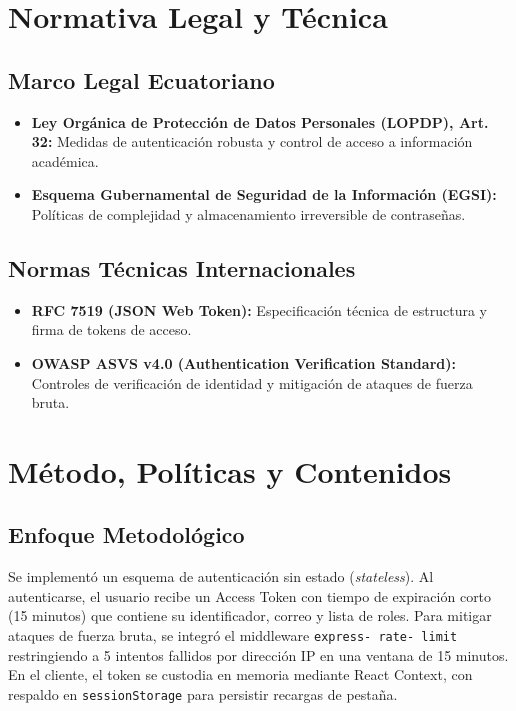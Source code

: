 \documentclass[12pt,a4paper]{article}
\begin{document}
\section{Normativa Legal y Técnica}
\subsection{Marco Legal Ecuatoriano}
\begin{itemize}[leftmargin=1.5em, itemsep=2pt]
    \item \textbf{Ley Orgánica de Protección de Datos Personales (LOPDP), Art. 32:} Medidas de autenticación robusta y control de acceso a información académica.
    \item \textbf{Esquema Gubernamental de Seguridad de la Información (EGSI):} Políticas de complejidad y almacenamiento irreversible de contraseñas.
\end{itemize}
\subsection{Normas Técnicas Internacionales}
\begin{itemize}[leftmargin=1.5em, itemsep=2pt]
    \item \textbf{RFC 7519 (JSON Web Token):} Especificación técnica de estructura y firma de tokens de acceso.
    \item \textbf{OWASP ASVS v4.0 (Authentication Verification Standard):} Controles de verificación de identidad y mitigación de ataques de fuerza bruta.
\end{itemize}

\section{Método, Políticas y Contenidos}
\subsection{Enfoque Metodológico}
Se implementó un esquema de autenticación sin estado (\textit{stateless}). Al autenticarse, el usuario recibe un Access Token con tiempo de expiración corto (15 minutos) que contiene su identificador, correo y lista de roles. Para mitigar ataques de fuerza bruta, se integró el middleware \texttt{express- rate- limit} restringiendo a 5 intentos fallidos por dirección IP en una ventana de 15 minutos. En el cliente, el token se custodia en memoria mediante React Context, con respaldo en \texttt{sessionStorage} para persistir recargas de pestaña.
\end{document}
